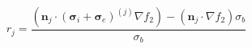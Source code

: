 $$
r_j = \frac{\left(\mathbf n_j\cdot\left(\boldsymbol\sigma_i+\boldsymbol\sigma_e\right)^{(j)}\nabla f_2\right) - \left(\mathbf n_j\cdot\nabla f_2\right) \sigma_b}{\sigma_b}
$$
